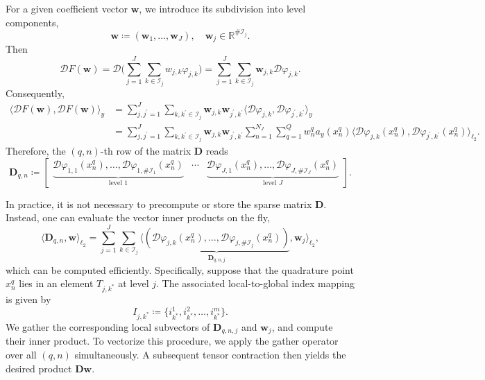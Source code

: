 \documentclass[a4paper,11pt]{amsart}
\numberwithin{equation}{section}
\theoremstyle{definition}
\theoremstyle{remark}
\theoremstyle{plain}
\begin{document}
For a given coefficient vector $\mathbf{w}$, we introduce its subdivision into level components,
\begin{equation*}
\mathbf{w}\coloneq (\mathbf{w}_{1},\ldots,\mathbf{w}_{J}), \quad \mathbf{w}_{j}\in\mathbb{R}^{\#\mathcal{I}_{j}}.
\end{equation*}
Then 
\begin{equation*}
\mathcal{D}F(\mathbf{w})=\mathcal{D}\Bigg(\sum_{j=1}^{J}\sum_{k\in\mathcal{I}_{j}}w_{j,k}\varphi_{j,k}\Bigg)=\sum_{j=1}^{J}\sum_{k\in\mathcal{I}_{j}}\mathbf{w}_{j,k}\mathcal{D}\varphi_{j,k}.
\end{equation*}
Consequently,
\begin{align*}
\langle \mathcal{D}F(\mathbf{w}),\mathcal{D}F(\mathbf{w}) \rangle_{y}
&=\sum_{j,j^{\prime}=1}^{J}\sum_{k,k^{\prime}\in\mathcal{I}_{j}}\mathbf{w}_{j,k}\mathbf{w}_{j^{\prime},k^{\prime}}\langle\mathcal{D}\varphi_{j,k},\mathcal{D}\varphi_{j^{\prime},k^{\prime}}\rangle_{y} \\
&=\sum_{j,j^{\prime}=1}^{J}\sum_{k,k^{\prime}\in\mathcal{I}_{j}}\mathbf{w}_{j,k}\mathbf{w}_{j^{\prime},k^{\prime}} \sum_{n=1}^{N_{J}}\sum_{q=1}^{Q}w_{n}^{q}a_{y}(x_{n}^{q})\langle\mathcal{D}\varphi_{j,k}(x_{n}^{q}),\mathcal{D}\varphi_{j^{\prime},k^{\prime}}(x_{n}^{q})\rangle_{\ell_{2}}.
\end{align*}
Therefore, the $(q,n)$-th row of the matrix $\mathbf{D}$ reads
\begin{equation*}
\mathbf{D}_{q,n} \coloneq 
\begin{bmatrix}
\underbrace{\mathcal{D}\varphi_{1,1}(x_{n}^{q}),\ldots,\mathcal{D}\varphi_{1,\#\mathcal{I}_{1}}(x_{n}^{q})}_{\text{level 1}} & \cdots & \underbrace{\mathcal{D}\varphi_{J,1}(x_{n}^{q}),\ldots,\mathcal{D}\varphi_{J,\#\mathcal{I}_{J}}(x_{n}^{q})}_{\text{level $J$}}
\end{bmatrix}.
\end{equation*}

In practice, it is not necessary to precompute or store the sparse matrix $\mathbf{D}$. Instead, one can evaluate the vector inner products on the fly,
\begin{equation*}
\langle \mathbf{D}_{q,n}, \mathbf{w} \rangle_{\ell_{2}}
= \sum_{j=1}^{J} \sum_{k \in \mathcal{I}_{j}}
\Big\langle 
\underbrace{(\mathcal{D}\varphi_{j,k}(x_{n}^{q}), \ldots, \mathcal{D}\varphi_{j,\#\mathcal{I}_{j}}(x_{n}^{q}))}_{\mathbf{D}_{q,n,j}},
\mathbf{w}_{j}
\Big\rangle_{\ell_{2}},
\end{equation*}
which can be computed efficiently. Specifically, suppose that the quadrature point $x_{n}^{q}$ lies in an element $T_{j,k^{*}}$ at level $j$. The associated local-to-global index mapping is given by
\begin{equation*}
I_{j,k^{*}} \coloneq \{ i_{k^{*}}^{1}, i_{k^{*}}^{2}, \ldots, i_{k^{*}}^{m} \}.
\end{equation*}
We gather the corresponding local subvectors of $\mathbf{D}_{q,n,j}$ and $\mathbf{w}_{j}$, and compute their inner product. To vectorize this procedure, we apply the gather operator over all $(q,n)$ simultaneously. A subsequent tensor contraction then yields the desired product $\mathbf{D}\mathbf{w}$.
\end{document}
